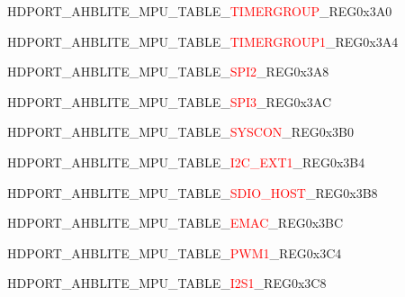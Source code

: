 \vspace{-3em}
\begin{register}{H}{DPORT\_AHBLITE\_MPU\_TABLE\_\textcolor{red}{TIMERGROUP}\_REG}{0x3A0}\label{regdesc:AHBLITEMPUTABLETIMERGROUPREG}
\end{register}
\vspace{-3em}
\begin{register}{H}{DPORT\_AHBLITE\_MPU\_TABLE\_\textcolor{red}{TIMERGROUP1}\_REG}{0x3A4}\label{regdesc:AHBLITEMPUTABLETIMERGROUP1REG}
\end{register}
\vspace{-3em}
\begin{register}{H}{DPORT\_AHBLITE\_MPU\_TABLE\_\textcolor{red}{SPI2}\_REG}{0x3A8}\label{regdesc:AHBLITEMPUTABLESPI2REG}
\end{register}
\vspace{-3em}
\begin{register}{H}{DPORT\_AHBLITE\_MPU\_TABLE\_\textcolor{red}{SPI3}\_REG}{0x3AC}\label{regdesc:AHBLITEMPUTABLESPI3REG}
\end{register}
\vspace{-3em}
\begin{register}{H}{DPORT\_AHBLITE\_MPU\_TABLE\_\textcolor{red}{SYSCON}\_REG}{0x3B0}\label{regdesc:AHBLITEMPUTABLEAPBCTRLREG}
\end{register}
\vspace{-3em}
\begin{register}{H}{DPORT\_AHBLITE\_MPU\_TABLE\_\textcolor{red}{I2C\_EXT1}\_REG}{0x3B4}\label{regdesc:AHBLITEMPUTABLEI2CEXT1REG}
\end{register}
\vspace{-3em}
\begin{register}{H}{DPORT\_AHBLITE\_MPU\_TABLE\_\textcolor{red}{SDIO\_HOST}\_REG}{0x3B8}\label{regdesc:AHBLITEMPUTABLESDIOHOSTREG}
\end{register}
\vspace{-3em}
\begin{register}{H}{DPORT\_AHBLITE\_MPU\_TABLE\_\textcolor{red}{EMAC}\_REG}{0x3BC}\label{regdesc:AHBLITEMPUTABLEEMACREG}
\end{register}
\vspace{-3em}
\begin{register}{H}{DPORT\_AHBLITE\_MPU\_TABLE\_\textcolor{red}{PWM1}\_REG}{0x3C4}\label{regdesc:AHBLITEMPUTABLEPWM1REG}
\end{register}
\vspace{-3em}
\begin{register}{H}{DPORT\_AHBLITE\_MPU\_TABLE\_\textcolor{red}{I2S1}\_REG}{0x3C8}\label{regdesc:AHBLITEMPUTABLEI2S1REG}
\end{register}
